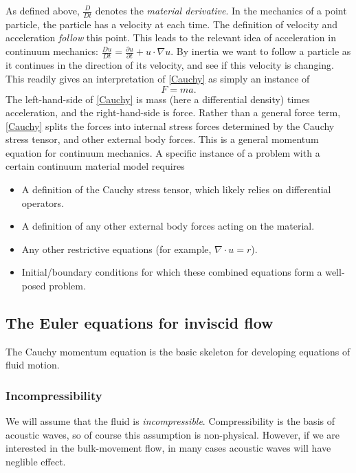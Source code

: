 \documentclass[11pt,a4paper]{memoir}
\begin{document}
As defined above, $\frac{D}{Dt}$ denotes the \textit{material derivative}. In the mechanics of a point particle,
the particle has a velocity at each time. The definition of velocity and acceleration \textit{follow} this point.
This leads to the relevant idea of acceleration in continuum mechanics:
$\frac{Du}{Dt} = \frac{\partial u}{\partial t} + u\cdot \nabla u$.
By inertia we want to follow a particle as it continues in the direction of its velocity, and see if this velocity is changing.
This readily gives an interpretation of \eqref{Cauchy} as simply an instance of
\begin{equation}\label{Newton}
    F = ma.
\end{equation}
The left-hand-side of \eqref{Cauchy} is mass (here a differential density) times acceleration,
and the right-hand-side is force. Rather than a general force term, \eqref{Cauchy} splits the forces into internal stress forces
determined by the Cauchy stress tensor, and other external body forces. This is a general momentum equation for
continuum mechanics. A specific instance of a problem with a certain continuum material model requires
\begin{itemize}
    \item A definition of the Cauchy stress tensor, which likely relies on differential operators.
    \item A definition of any other external body forces acting on the material.
    \item Any other restrictive equations (for example, $\nabla \cdot u = r$).
    \item Initial/boundary conditions for which these combined equations form a well-posed problem.
\end{itemize}
\subsection{The Euler equations for inviscid flow} %
The Cauchy momentum equation is the basic skeleton for developing equations of fluid motion.

\subsubsection{Incompressibility}
We will assume that the fluid is \textit{incompressible}.
Compressibility is the basis of acoustic waves, so of course this assumption is non-physical. However, if we are interested in the bulk-movement flow,
in many cases acoustic waves will have neglible effect.
\end{document}
